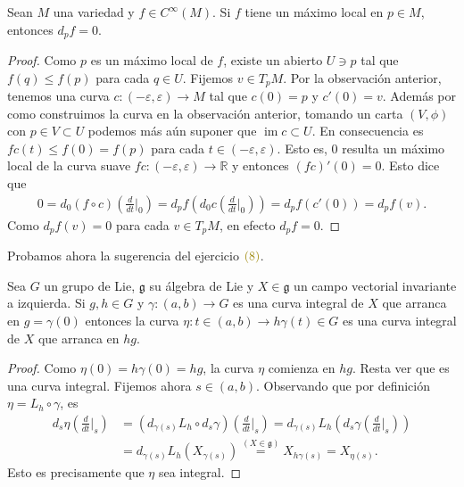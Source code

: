 \documentclass[11pt]{article}
\newcommand{\R}{\mathbb{R}}
\newcommand{\im}{\operatorname{im}}
\newcommand{\eps}{\varepsilon}
\newcommand{\paint}[1]{\color{color}{#1}}
\newenvironment{exercise}[2][Ejercicio]{\begin{trivlist}
\item[\hskip \labelsep \paint{{\bfseries #1}}\hskip \labelsep {\bfseries #2.}]}{\end{trivlist}}
\newenvironment{proposition}[2][Proposici\'on]{\begin{trivlist}
\item[\hskip \labelsep \paint{{\bfseries #1}}\hskip \labelsep {\bfseries #2.}]}{\end{trivlist}}
\begin{document}
\begin{exercise}{2} Sean $M$ una variedad y $f\in C^\infty(M)$. Si $f$ tiene un m\'aximo
local en $p\in M$, entonces $d_pf = 0$.
\end{exercise}
\begin{proof} Como $p$ es un m\'aximo local de $f$, existe un abierto $U \ni p$ tal que $f(q) \leq f(p)$ para cada $q \in U$. Fijemos $v \in T_pM$. Por la observaci\'on anterior, tenemos una curva $c : (-\eps,\eps) \to M$ tal que $c(0) = p$ y $c'(0) = v$. Adem\'as por como construimos la curva en la observaci\'on anterior, tomando un carta $(V,\phi)$ con $p \in V \subset U$ podemos m\'as a\'un suponer que $\im c \subset U$. En consecuencia es $fc(t) \leq f(0) = f(p)$ para cada $t \in (-\eps,\eps)$. Esto es, $0$ resulta un m\'aximo local de la curva suave $fc : (-\eps,\eps) \to \R$ y entonces $(fc)'(0) = 0$. Esto dice que
\begin{align*}
0 = d_0(f\circ c)\left(\frac{d}{dt}\Big|_0\right)  = d_pf\left(d_0c\left(\frac{d}{dt}\Big|_0\right)\right) = d_pf(c'(0)) = d_pf(v).
\end{align*}
Como $d_pf(v) = 0$ para cada $v \in T_pM$, en efecto $d_pf = 0$.
\end{proof}

Probamos ahora la sugerencia del ejercicio $\paint{(8)}$.

\begin{proposition}{2} Sea $G$ un grupo de Lie, $\mathfrak{g}$ su \'algebra de Lie y $X \in \mathfrak{g}$ un campo vectorial invariante a izquierda. Si $g, h \in G$ y $\gamma : (a,b) \to G$ es una curva integral de $X$ que arranca en $g = \gamma(0)$ entonces la curva $\eta : t \in (a,b) \to h\gamma(t) \in G$ es una curva integral de $X$ que arranca en $hg$. 
\end{proposition}
\begin{proof} Como $\eta(0) = h\gamma(0) = hg$, la curva $\eta$ comienza en $hg$. Resta ver que es una curva integral. Fijemos ahora $s \in (a,b)$. Observando que por definici\'on $\eta = L_h \circ \gamma$, es
\begin{align*}
d_s \eta \left(\frac{d}{dt}\Bigg|_{s}\right) &= (d_{\gamma(s)}L_h \circ d_s\gamma) \left(\frac{d}{dt}\Bigg|_{s}\right) = d_{\gamma(s)}L_h \left( d_s\gamma \left(\frac{d}{dt}\Bigg|_{s}\right) \right)\\
& = d_{\gamma(s)}L_h(X_{\gamma(s)}) \stackrel{(X \in \mathfrak{g})}{=} X_{h\gamma(s)} = X_{\eta(s)}.
\end{align*}
Esto es precisamente que $\eta$ sea integral.
\end{proof}
\end{document}

